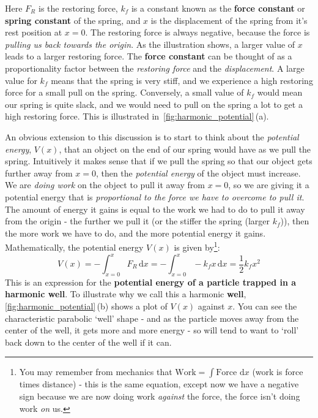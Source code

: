 \documentclass{memoir}[11pt,oneside,a4paper,openany]
\begin{document}
Here $F_R$ is the restoring force, $k_f$ is a constant known as the \textbf{force constant} or \textbf{spring constant} of the spring, and $x$ is the displacement of the spring from it's rest position at $x=0$. The restoring force is always negative, because the force is \emph{pulling us back towards the origin}. As the illustration shows, a larger value of $x$ leads to a larger restoring force. The \textbf{force constant} can be thought of as a proportionality factor between the \emph{restoring force} and the \emph{displacement}. A large value for $k_f$ means that the spring is very stiff, and we experience a high restoring force for a small pull on the spring. Conversely, a small value of $k_f$ would mean our spring is quite slack, and we would need to pull on the spring a lot to get a high restoring force. This is illustrated in~\autoref{fig:harmonic_potential}\,(a). 

An obvious extension to this discussion is to start to think about the \emph{potential energy}, $V(x)$, that an object on the end of our spring would have as we pull the spring. Intuitively it makes sense that if we pull the spring so that our object gets further away from $x=0$, then the \emph{potential energy} of the object must increase. We are \emph{doing work} on the object to pull it away from $x=0$, so we are giving it a potential energy that is \emph{proportional to the force we have to overcome to pull it}. The amount of energy it gains is equal to the work we had to do to pull it away from the origin - the further we pull it (or the stiffer the spring (larger $k_f$)), then the more work we have to do, and the more potential energy it gains. Mathematically, the potential energy $V(x)$ is given by\footnote{You may remember from mechanics that $\text{Work} = \int \text{Force} \,\,\mathrm{d}x$ (work is force times distance) - this is the same equation, except now we have a negative sign because we are now doing work \emph{against} the force, the force isn't doing work \emph{on} us.}:
\begin{equation}
	V(x) = -\int_{x=0}^{x} F_R \,\mathrm{d}x = -\int_{x=0}^{x} -k_fx \,\mathrm{d}x = \frac{1}{2}k_fx^2
\end{equation}
This is an expression for the \textbf{potential energy of a particle trapped in a harmonic well}. To illustrate why we call this a harmonic \textbf{well}, \autoref{fig:harmonic_potential}\,(b) shows a plot of $V(x)$ against $x$. You can see the characteristic parabolic `well' shape - and as the particle moves away from the center of the well, it gets more and more energy - so will tend to want to `roll' back down to the center of the well if it can. 
\end{document}
